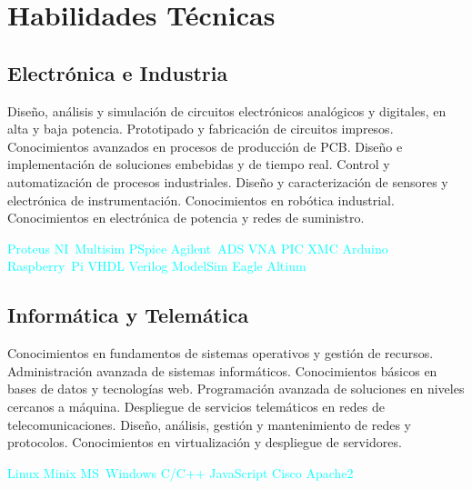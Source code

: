\documentclass[11pt,a4paper,sans,spanish]{moderncv}
\begin{document}
\section{Habilidades Técnicas}

\subsection{Electrónica e Industria}
{Diseño, análisis y simulación de circuitos electrónicos analógicos y digitales, en alta y baja potencia.}\quad{}
Prototipado y fabricación de circuitos impresos.\quad{}
{Conocimientos avanzados en procesos de producción de PCB.}\quad{} 
Diseño e implementación de soluciones embebidas y de tiempo real.\quad
{Control y automatización de procesos industriales.}\quad
Diseño y caracterización de sensores y electrónica de instrumentación.\quad
{Conocimientos en robótica industrial.}\quad
{Conocimientos en electrónica de potencia y redes de suministro.}

\begin{center}
\textcolor{cyan}{
Proteus \quad{} NI~Multisim \quad{} PSpice \quad{}
Agilent~ADS \quad{} VNA \quad{}
PIC \quad{} XMC \quad{} Arduino \quad{} Raspberry~Pi \quad{}
VHDL \quad{} Verilog \quad{} ModelSim \quad{}
Eagle \quad{} Altium
}
\end{center}

\subsection{Informática y Telemática}
{Conocimientos en fundamentos de sistemas operativos y gestión de recursos.}\quad
{Administración avanzada de sistemas informáticos.}\quad
{Conocimientos básicos en bases de datos y tecnologías web.}\quad
{Programación avanzada de soluciones en niveles cercanos a máquina.}\quad
{Despliegue de servicios telemáticos en redes de telecomunicaciones. }\quad
{Diseño, análisis, gestión y mantenimiento de redes y protocolos.}\quad
{Conocimientos en virtualización y despliegue de servidores.}\quad

\begin{center}
\textcolor{cyan}{
Linux \quad{} Minix \quad{} MS~Windows \quad{} C/C++ \quad{} JavaScript \quad{} Cisco \quad{} Apache2 
}
\end{center}
\end{document}
